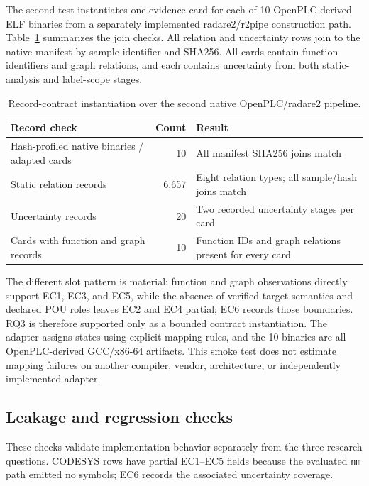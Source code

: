\documentclass[manuscript,screen,review]{acmart}
\begin{document}
The second test instantiates one evidence card for each of 10 OpenPLC-derived ELF binaries from a separately implemented radare2/r2pipe construction path. Table~\ref{tab:cross_pipeline} summarizes the join checks. All relation and uncertainty rows join to the native manifest by sample identifier and SHA256. All cards contain function identifiers and graph relations, and each contains uncertainty from both static-analysis and label-scope stages.

\begin{table}[t]
\centering
\small
\caption{Record-contract instantiation over the second native OpenPLC/radare2 pipeline.}
\label{tab:cross_pipeline}
\begin{tabularx}{\textwidth}{>{\raggedright\arraybackslash}Xr>{\raggedright\arraybackslash}X}
\toprule
Record check & Count & Result \\
\midrule
Hash-profiled native binaries / adapted cards & 10 & All manifest SHA256 joins match \\
Static relation records & 6,657 & Eight relation types; all sample/hash joins match \\
Uncertainty records & 20 & Two recorded uncertainty stages per card \\
Cards with function and graph records & 10 & Function IDs and graph relations present for every card \\
\bottomrule
\end{tabularx}
\end{table}

The different slot pattern is material: function and graph observations directly support EC1, EC3, and EC5, while the absence of verified target semantics and declared POU roles leaves EC2 and EC4 partial; EC6 records those boundaries. RQ3 is therefore supported only as a bounded contract instantiation. The adapter assigns states using explicit mapping rules, and the 10 binaries are all OpenPLC-derived GCC/x86-64 artifacts. This smoke test does not estimate mapping failures on another compiler, vendor, architecture, or independently implemented adapter.

\subsection{Leakage and regression checks}

These checks validate implementation behavior separately from the three research questions. CODESYS rows have partial EC1--EC5 fields because the evaluated \texttt{nm} path emitted no symbols; EC6 records the associated uncertainty coverage.
\end{document}
